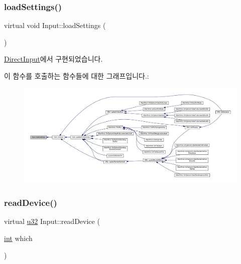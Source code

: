 \subsubsection{\texorpdfstring{load\+Settings()}{loadSettings()}}
{\footnotesize\ttfamily virtual void Input\+::load\+Settings (\begin{DoxyParamCaption}{ }\end{DoxyParamCaption})\hspace{0.3cm}{\ttfamily [pure virtual]}}



\mbox{\hyperlink{class_direct_input_a4b63243a3581158956baf495a0dee51e}{Direct\+Input}}에서 구현되었습니다.

이 함수를 호출하는 함수들에 대한 그래프입니다.\+:
\nopagebreak
\begin{figure}[H]
\begin{center}
\leavevmode
\includegraphics[width=350pt]{class_input_a098708c062b906c84ab036c04d447a29_icgraph}
\end{center}
\end{figure}
\mbox{\label{class_input_a57a47977bda8fcf6de237401b4c2e0dd}} 
\subsubsection{\texorpdfstring{read\+Device()}{readDevice()}}
{\footnotesize\ttfamily virtual \mbox{\hyperlink{_system_8h_a10e94b422ef0c20dcdec20d31a1f5049}{u32}} Input\+::read\+Device (\begin{DoxyParamCaption}\item[{\mbox{\hyperlink{_util_8cpp_a0ef32aa8672df19503a49fab2d0c8071}{int}}}]{which }\end{DoxyParamCaption})\hspace{0.3cm}{\ttfamily [pure virtual]}}



